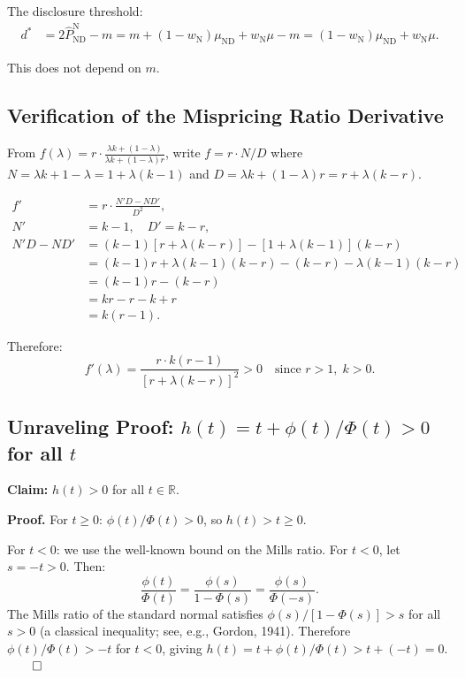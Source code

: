 \documentclass[12pt]{article}
\theoremstyle{plain}
\theoremstyle{definition}
\newcommand{\ND}{\mathrm{ND}}
\newcommand{\N}{\mathrm{N}}
\begin{document}
The disclosure threshold:
\begin{align*}
d^* &= 2\hat{P}_{\ND}^\N - m = m + (1-w_\N)\mu_{\ND} + w_\N\mu - m = (1-w_\N)\mu_{\ND} + w_\N\mu.
\end{align*}

This does not depend on $m$.

\subsection{Verification of the Mispricing Ratio Derivative}

From $f(\lambda) = r \cdot \frac{\lambda k + (1-\lambda)}{\lambda k + (1-\lambda)r}$, write $f = r \cdot N/D$ where $N = \lambda k + 1 - \lambda = 1 + \lambda(k-1)$ and $D = \lambda k + (1-\lambda)r = r + \lambda(k-r)$.

\begin{align*}
f' &= r \cdot \frac{N'D - ND'}{D^2}, \\
N' &= k - 1, \quad D' = k - r, \\
N'D - ND' &= (k-1)[r + \lambda(k-r)] - [1 + \lambda(k-1)](k-r) \\
&= (k-1)r + \lambda(k-1)(k-r) - (k-r) - \lambda(k-1)(k-r) \\
&= (k-1)r - (k-r) \\
&= kr - r - k + r \\
&= k(r-1).
\end{align*}

Therefore:
\[
f'(\lambda) = \frac{r \cdot k(r-1)}{[r + \lambda(k-r)]^2} > 0 \quad \text{since } r > 1, \; k > 0.
\]


\subsection{Unraveling Proof: $h(t) = t + \phi(t)/\Phi(t) > 0$ for all $t$}

\textbf{Claim:} $h(t) > 0$ for all $t \in \mathbb{R}$.

\textbf{Proof.} For $t \geq 0$: $\phi(t)/\Phi(t) > 0$, so $h(t) > t \geq 0$.

For $t < 0$: we use the well-known bound on the Mills ratio. For $t < 0$, let $s = -t > 0$. Then:
\[
\frac{\phi(t)}{\Phi(t)} = \frac{\phi(s)}{1 - \Phi(s)} = \frac{\phi(s)}{\Phi(-s)}.
\]
The Mills ratio of the standard normal satisfies $\phi(s)/[1 - \Phi(s)] > s$ for all $s > 0$ (a classical inequality; see, e.g., Gordon, 1941). Therefore $\phi(t)/\Phi(t) > -t$ for $t < 0$, giving $h(t) = t + \phi(t)/\Phi(t) > t + (-t) = 0$. $\qed$
\end{document}
